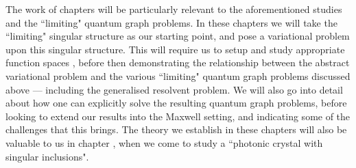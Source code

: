 The work of chapters  will be particularly relevant to the aforementioned studies and the ``limiting" quantum graph problems.
In these chapters we will take the ``limiting" singular structure as our starting point, and pose a variational problem upon this singular structure.
This will require us to setup and study appropriate function spaces , before then demonstrating the relationship between the abstract variational problem and the various ``limiting" quantum graph problems discussed above --- including the generalised resolvent problem.
We will also go into detail about how one can explicitly solve the resulting quantum graph problems, before looking to extend our results into the Maxwell setting, and indicating some of the challenges that this brings.
The theory we establish in these chapters will also be valuable to us in chapter , when we come to study a ``photonic crystal with singular inclusions".